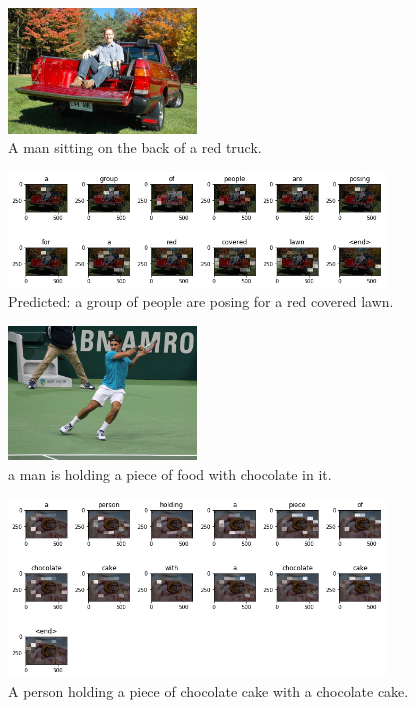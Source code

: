 
\begin{figure}[hpt]
	\centering
	\includegraphics[width=5cm]{images/ch5/example3.png}
	\caption{A man sitting on the back of a red truck.}
	\label{fig:example3}
\end{figure}

\begin{figure}[hpt]
	\centering
	\includegraphics[width=10cm]{images/ch5/example3-attention.png}
	\caption{Predicted: a group of people are posing for a red covered lawn.}
	\label{fig:example3-att}
\end{figure}


\begin{figure}[hpt]
	\centering
	\includegraphics[width=5cm]{images/ch5/example1.png}
	\caption{a man is holding a piece of food with chocolate in it.}
	\label{fig:example4}
\end{figure}

\begin{figure}[hpt]
	\centering
	\includegraphics[width=10cm]{images/ch5/example4-attention.png}
	\caption{A person holding a piece of chocolate cake with a chocolate cake.}
	\label{fig:example4-att}
\end{figure}

